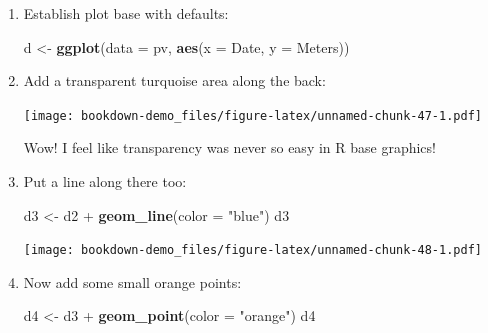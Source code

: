 \documentclass[]{book}
\newenvironment{Shaded}{\begin{snugshade}}{\end{snugshade}}
\newcommand{\KeywordTok}[1]{\textcolor[rgb]{0.13,0.29,0.53}{\textbf{{#1}}}}
\newcommand{\DataTypeTok}[1]{\textcolor[rgb]{0.13,0.29,0.53}{{#1}}}
\newcommand{\FloatTok}[1]{\textcolor[rgb]{0.00,0.00,0.81}{{#1}}}
\newcommand{\StringTok}[1]{\textcolor[rgb]{0.31,0.60,0.02}{{#1}}}
\newcommand{\NormalTok}[1]{{#1}}
\theoremstyle{definition}
\theoremstyle{definition}
\theoremstyle{remark}
\begin{document}
\begin{enumerate}
\def\labelenumi{\arabic{enumi}.}
\item
  Establish plot base with defaults:

\begin{Shaded}
\begin{Highlighting}[]
\NormalTok{d <-}\StringTok{ }\KeywordTok{ggplot}\NormalTok{(}\DataTypeTok{data =} \NormalTok{pv, }\KeywordTok{aes}\NormalTok{(}\DataTypeTok{x =} \NormalTok{Date, }\DataTypeTok{y =} \NormalTok{Meters))}
\end{Highlighting}
\end{Shaded}
\item
  Add a transparent turquoise area along the back:

\begin{Shaded}
\end{Shaded}

  \texttt{[image: bookdown-demo\_files/figure-latex/unnamed-chunk-47-1.pdf]}

  Wow! I feel like transparency was never so easy in R base graphics!
\item
  Put a line along there too:

\begin{Shaded}
\begin{Highlighting}[]
\NormalTok{d3 <-}\StringTok{ }\NormalTok{d2 +}\StringTok{ }\KeywordTok{geom_line}\NormalTok{(}\DataTypeTok{color =} \StringTok{"blue"}\NormalTok{)}
\NormalTok{d3}
\end{Highlighting}
\end{Shaded}

  \texttt{[image: bookdown-demo\_files/figure-latex/unnamed-chunk-48-1.pdf]}
\item
  Now add some small orange points:

\begin{Shaded}
\begin{Highlighting}[]
\NormalTok{d4 <-}\StringTok{ }\NormalTok{d3 +}\StringTok{ }\KeywordTok{geom_point}\NormalTok{(}\DataTypeTok{color =} \StringTok{"orange"}\NormalTok{)}
\NormalTok{d4}
\end{Highlighting}
\end{Shaded}


\end{enumerate}
\end{document}
